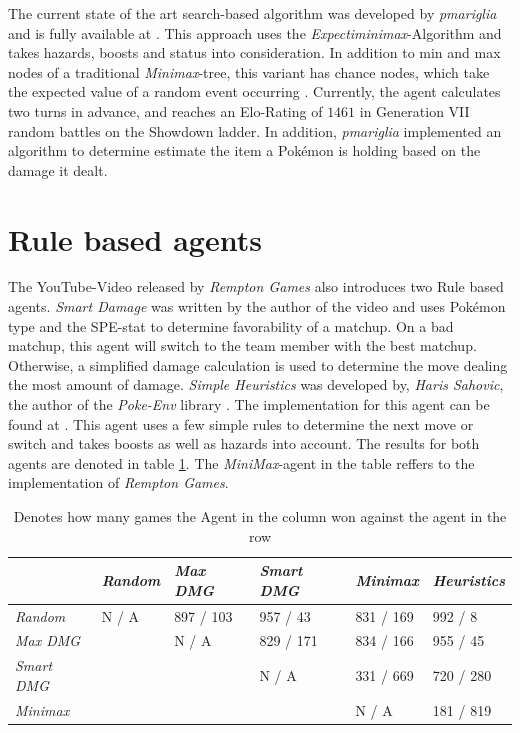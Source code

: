 The current state of the art search-based algorithm was developed by \emph{pmariglia} and is fully available
at \cite{Github:pmariglia-showdown}. This approach uses the \textit{Expectiminimax}-Algorithm and takes
hazards, boosts and status into consideration. In addition to \grqq min\grqq{}
and \grqq max\grqq{} nodes of a traditional \emph{Minimax}-tree, this variant has \grqq chance\grqq{} nodes, which take the 
expected value of a random event occurring \cite{wiki:Expectiminimax}. Currently, the agent calculates two turns in
advance, and reaches an Elo-Rating of $1461$ in Generation VII random battles on the Showdown ladder. 
In addition, \emph{pmariglia} implemented an algorithm to determine estimate the item a Pokémon is holding
based on the damage it dealt. 

\section{Rule based agents}
\label{sec:related-rulebased}
The YouTube-Video released by \emph{Rempton Games} \cite{RemptonGames:PokemonAI} also introduces two Rule based agents.
\textit{Smart Damage} was written by the author of the video and uses Pokémon type and the \ac{SPE}-stat to determine
favorability of a matchup. On a bad matchup, this agent will switch to the team member with the best matchup. Otherwise,
a simplified damage calculation is used to determine the move dealing the most amount of damage. \textit{Simple 
Heuristics} was developed by, \emph{Haris Sahovic}, the author of the \emph{Poke-Env} library \cite{PokeEnv:Github}.
The implementation for this agent can be found at \cite{PokeEnv:Baselines}. This agent uses a few simple rules
to determine the next move or switch and takes boosts as well as hazards into account. The results for both agents
are denoted in table \ref{tbl:Youtube-Results}. The \emph{MiniMax}-agent in the table reffers to the implementation
of \emph{Rempton Games}.
\begin{table}[h]
    \centering
        \begin{tabular}{|l|l|l|l|l|l|}
            \hline
            & \emph{Random} & \emph{Max \ac{DMG}} & \emph{Smart \ac{DMG}} & \emph{Minimax} & \emph{Heuristics} \\
            \hline
            \emph{Random} & N / A & 897 / 103 & 957 / 43 & 831 / 169 & 992 / 8 \\
            \hline
            \emph{Max \ac{DMG}} & & N / A & 829 / 171 & 834 / 166 & 955 / 45 \\
            \hline
            \emph{Smart \ac{DMG}} & & & N / A & 331 / 669 & 720 / 280 \\
            \hline
            \emph{Minimax} & & & & N / A & 181 / 819 \\
            \hline 
        \end{tabular}
        \caption{Denotes how many games the Agent in the column won against the agent in the row \cite{RemptonGames:PokemonAI}}
        \label{tbl:Youtube-Results}
\end{table}

